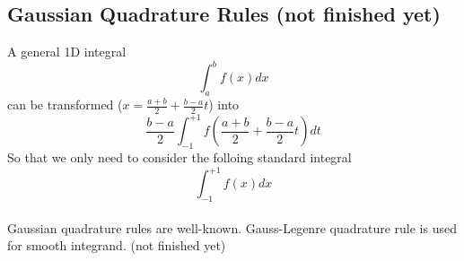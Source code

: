 \documentclass [10pt,letterpaper]{article}
\begin{document}
\subsection{Gaussian Quadrature Rules (not finished yet)}
\label{sub:gaussian-quadrature-rules}
A general 1D integral
\begin{equation} \label{eq:general-1D-integral-dx}
	\int \nolimits_{a}^{b}
	f(x)
	dx
\end{equation}
can be transformed ($x= \frac{a+b}{2} + \frac{b-a}{2} t$) into 
\begin{equation}  \label{eq:general-1D-integral-dt} 
	\frac{b-a}{2}
	\int \nolimits_{-1}^{+1} 
	f(
		\frac{a+b}{2} 
		+
		\frac{b-a}{2}
		t
	)
	dt
\end{equation}
So that we only need to consider the folloing standard integral
\begin{equation} \label{eq:standard-1D-integral-dx}
	\int \nolimits_{-1}^{+1}
	f(x)
	dx 
\end{equation}
\\
Gaussian quadrature rules are well-known.
Gauss-Legenre quadrature rule is used for smooth integrand.
(not finished yet)
\end{document}
